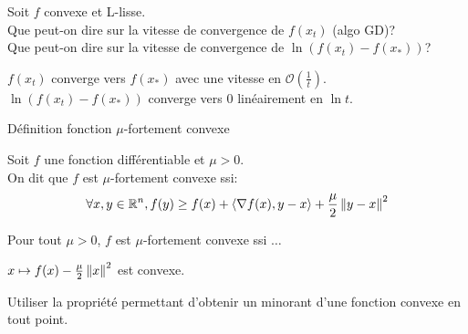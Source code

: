 \begin{note}
  \begin{field}
    Soit $f$ convexe et L-lisse.\\
    Que peut-on dire sur la vitesse de convergence de $f(x_t)$ (algo
    GD)?\\
    Que peut-on dire sur la vitesse de convergence de $\ln(f(x_t) - f(x_*))$?
  \end{field}
  \begin{field}
    $f(x_t)$ converge vers $f(x_*)$ avec une vitesse en
    $\mathcal{O}(\frac{1}{t})$.\\
    $\ln(f(x_t) - f(x_*))$ converge vers 0 linéairement en $\ln t$.

  \end{field}
  \begin{field}

  \end{field}
\end{note}

\begin{note}
  \begin{field}
    Définition fonction $\mu$-fortement convexe
  \end{field}
  \begin{field}
    Soit $f$ une fonction différentiable et $\mu > 0$.\\
    On dit que $f$ est $\mu$-fortement convexe ssi:
    $$\forall x,y \in \mathbb{R}^n, f(y) \geq f(x) + \langle\nabla f(x),y-x\rangle
    + \frac{\mu}{2}\left\lVert y-x\right\rVert^2$$
  \end{field}
  \begin{field}

  \end{field}
\end{note}


\begin{note}
  \begin{field}
    Pour tout $\mu > 0$, $f$ est $\mu$-fortement convexe ssi $\dots$
  \end{field}
  \begin{field}
    $x \mapsto f(x) - \frac{\mu}{2}\left\lVert x\right\rVert^2$ est convexe.
  \end{field}
  \begin{field}
    Utiliser la propriété permettant d'obtenir un minorant d'une
    fonction convexe en tout point.
  \end{field}
\end{note}

